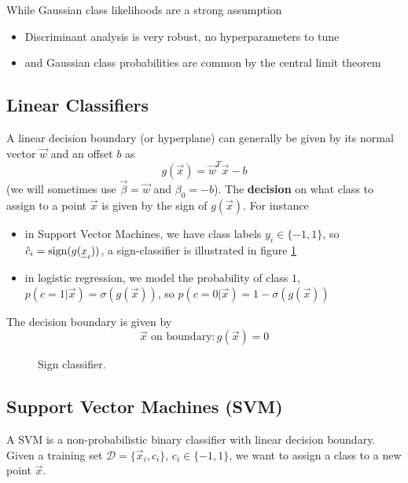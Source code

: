 While Gaussian class likelihoods are a strong assumption
\begin{itemize}
    \item Discriminant analysis is very robust, no hyperparameters to tune
    \item and Gaussian class probabilities are common by the central limit theorem
\end{itemize}

\subsection{Linear Classifiers}
A linear decision boundary (or hyperplane) can generally be
given by its normal vector $\vec{w}$ and an offset $b$ as
\begin{equation}
    g(\vec{x}) = \vec{w}^T \vec{x} - b
\end{equation}
(we will sometimes use $\vec{\beta} = \vec{w}$ and $\beta_0 = -b$).
The \textbf{decision} on what class to assign to a point $\vec{x}$ is given
by the sign of $g(\vec{x})$. For instance
\begin{itemize}
    \item in Support Vector Machines, we have class labels $y_i \in \{-1, 1\}$, so $\hat{c}_i = \sign(g(\vec{x}_i))$, a sign-classifier is illustrated in figure \ref{fig:sign_classifier}
    \item in logistic regression, we model the probability of class $1$, $p(c = 1 | \vec{x}) = \sigma(g(\vec{x}))$, so $p(c = 0 | \vec{x}) = 1 - \sigma(g(\vec{x}))$
\end{itemize}
The decision boundary is given by
\begin{equation}
    \vec{x} \text{ on boundary}: g(\vec{x}) = 0
\end{equation}


\begin{figure}[!htb]
    \centering
    
    \caption{Sign classifier.}
    \label{fig:sign_classifier}
\end{figure}

\subsection{Support Vector Machines (SVM)}
A SVM is a non-probabilistic binary classifier with linear decision boundary. Given
a training set $\mathcal{D} = \{ \vec{x}_i, c_i \}$, $c_i \in \{-1, 1\}$, we want
to assign a class to a new point $\vec{x}$.

